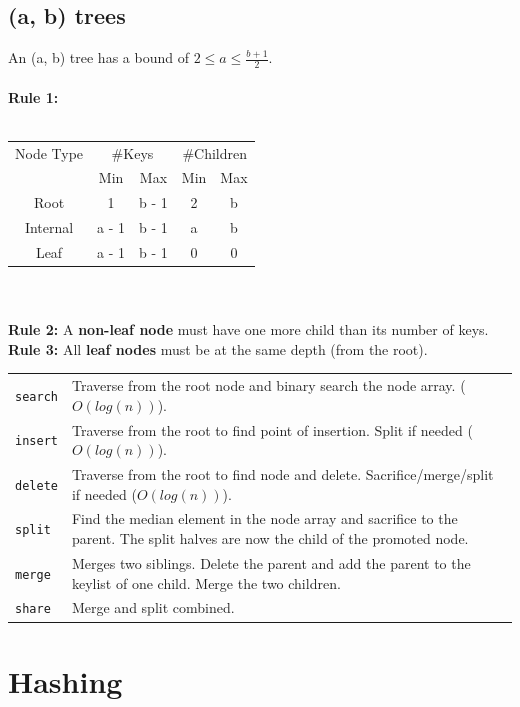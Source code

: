 \documentclass[10pt,landscape,a4paper]{article}
\begin{document}
\begin{multicols*}{4}
\subsection{(a, b) trees}
An (a, b) tree has a bound of $2 \le a \le \frac{b+1}{2}$.\\\\
\textbf{Rule 1:}\\\\
\begin{tabular}{c|c|c|c|c}
    Node Type   &   \multicolumn{2}{|c|}{\#Keys} &  \multicolumn{2}{|c}{\#Children} \\
    {}          &   Min     &   Max            &    Min     &   Max \\
    \hline
    Root        &   1       &   b - 1           &   2       &   b   \\
    \hline
    Internal    &   a - 1   &   b - 1           &   a       &   b   \\
    \hline
    Leaf        &   a - 1   &   b - 1           &   0       &   0   \\
\end{tabular} \\\\
\textbf{Rule 2:} A \textbf{non-leaf node} must have one more child than its number of keys. \\
\textbf{Rule 3:} All \textbf{leaf nodes} must be at the same depth (from the root). \\
\begin{tabular}{p{1cm} p{5.5cm}}
    \verb!search!   & Traverse from the root node and binary search the node array. ($O(log(n))$).\\
    \verb!insert!   & Traverse from the root to find point of insertion. Split if needed ($O(log(n))$).  \\
    \verb!delete!   & Traverse from the root to find node and delete. Sacrifice/merge/split if needed ($O(log(n))$). \\
    \verb!split!    & Find the median element in the node array and sacrifice to the parent. The split halves are now the child of the promoted node. \\
    \verb!merge!    & Merges two siblings. Delete the parent and add the parent to the keylist of one child. Merge the two children. \\
    \verb!share!    & Merge and split combined. \\
\end{tabular}

\section{Hashing}


\end{multicols*}
\end{document}
